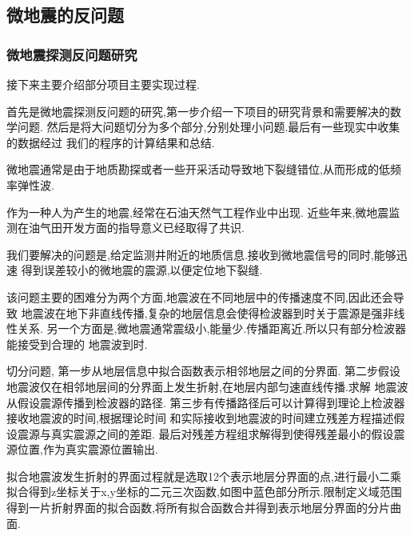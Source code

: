 \documentclass[UTF8]{ctexbeamer}	%
\theoremstyle{plain}
\theoremstyle{definition}
\theoremstyle{remark}
\numberwithin{equation}{section}
\begin{document}
\subsection{微地震的反问题}

\begin{frame}
    \frametitle{微地震探测反问题研究}
    接下来主要介绍部分项目主要实现过程.

    首先是微地震探测反问题的研究,第一步介绍一下项目的研究背景和需要解决的数学问题.
    然后是将大问题切分为多个部分,分别处理小问题.最后有一些现实中收集的数据经过
    我们的程序的计算结果和总结.
\end{frame}

\begin{frame}
    微地震通常是由于地质勘探或者一些开采活动导致地下裂缝错位,从而形成的低频率弹性波.

    作为一种人为产生的地震,经常在石油天然气工程作业中出现.
    近些年来,微地震监测在油气田开发方面的指导意义已经取得了共识.
\end{frame}

\begin{frame}
    我们要解决的问题是,给定监测井附近的地质信息.接收到微地震信号的同时,能够迅速
    得到误差较小的微地震的震源,以便定位地下裂缝.

    该问题主要的困难分为两个方面,地震波在不同地层中的传播速度不同,因此还会导致
    地震波在地下非直线传播,复杂的地层信息会使得检波器到时关于震源是强非线性关系.
    另一个方面是,微地震通常震级小,能量少.传播距离近.所以只有部分检波器能接受到合理的
    地震波到时.
\end{frame}

\begin{frame}
    切分问题,
    第一步从地层信息中拟合函数表示相邻地层之间的分界面.
    第二步假设地震波仅在相邻地层间的分界面上发生折射,在地层内部匀速直线传播.求解
    地震波从假设震源传播到检波器的路径.
    第三步有传播路径后可以计算得到理论上检波器接收地震波的时间,根据理论时间
    和实际接收到地震波的时间建立残差方程描述假设震源与真实震源之间的差距.
    最后对残差方程组求解得到使得残差最小的假设震源位置,作为真实震源位置输出.

\end{frame}

\begin{frame}
    拟合地震波发生折射的界面过程就是选取12个表示地层分界面的点,进行最小二乘
    拟合得到z坐标关于x,y坐标的二元三次函数,如图中蓝色部分所示.限制定义域范围
    得到一片折射界面的拟合函数,将所有拟合函数合并得到表示地层分界面的分片曲面.
\end{frame}
\end{document}

